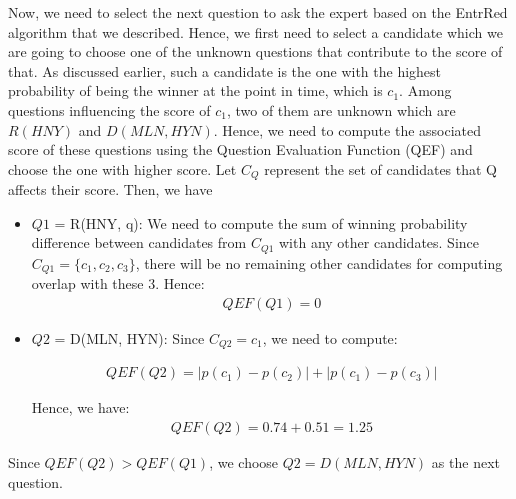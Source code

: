 Now, we need to select the next question to ask the expert based on the EntrRed algorithm that we described. Hence, we first need to select a candidate which we are going to choose one of the unknown questions that contribute to the score of that. As discussed earlier, such a candidate is the one with the highest probability of being the winner at the point in time, which is $c_1$. Among questions influencing the score of $c_1$, two of them are unknown which are $R(HNY)$ and $D(MLN, HYN)$. Hence, we need to compute the associated score of these questions using the Question Evaluation Function (QEF) and choose the one with higher score. Let $C_Q$ represent the set of candidates that Q affects their score. Then, we have
\begin{itemize}
        \item $Q1$ = R(HNY, q): We need to compute the sum of winning probability difference between candidates from $C_{Q1}$ with any other candidates. Since $C_{Q1} = \{c_1, c_2, c_3\}$, there will be no remaining other candidates for computing overlap with these 3. Hence:
        \begin{align*}
            QEF(Q1) = 0
        \end{align*}
        \item $Q2$ = D(MLN, HYN): Since $C_{Q2} = {c_1}$, we need to compute: 

        \begin{align*}
            QEF(Q2) = |p(c_1) - p(c_2)| + |p(c_1) - p(c_3)|
        \end{align*}
        
        Hence, we have:
        \begin{align*}
            QEF(Q2) = 0.74 + 0.51 = 1.25
        \end{align*}
    \end{itemize}
    Since $QEF(Q2) > QEF(Q1)$, we choose $Q2 = D(MLN, HYN)$ as the next question. 

